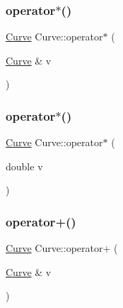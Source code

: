 \mbox{\label{class_curve_a671fb149eecca0baf80672a6e2ffc8a5}} 
\subsubsection{\texorpdfstring{operator$\ast$()}{operator*()}\hspace{0.1cm}{\footnotesize\ttfamily [1/2]}}
{\footnotesize\ttfamily \hyperlink{class_curve}{Curve} Curve\+::operator$\ast$ (\begin{DoxyParamCaption}\item[{\hyperlink{class_curve}{Curve} \&}]{v }\end{DoxyParamCaption})}

\mbox{\label{class_curve_a9ed9c49020ce01f29587000711963beb}} 
\subsubsection{\texorpdfstring{operator$\ast$()}{operator*()}\hspace{0.1cm}{\footnotesize\ttfamily [2/2]}}
{\footnotesize\ttfamily \hyperlink{class_curve}{Curve} Curve\+::operator$\ast$ (\begin{DoxyParamCaption}\item[{double}]{v }\end{DoxyParamCaption})}

\mbox{\label{class_curve_a015ca17f63cc971bb7c2885b2d2de2df}} 
\subsubsection{\texorpdfstring{operator+()}{operator+()}\hspace{0.1cm}{\footnotesize\ttfamily [1/2]}}
{\footnotesize\ttfamily \hyperlink{class_curve}{Curve} Curve\+::operator+ (\begin{DoxyParamCaption}\item[{\hyperlink{class_curve}{Curve} \&}]{v }\end{DoxyParamCaption})}

\mbox{\label{class_curve_a03352202f80edde95e6581485ee78e1c}} 
